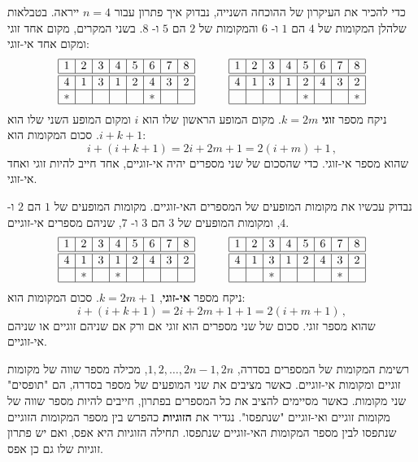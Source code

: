 כדי להכיר את העיקרון של ההוכחה השנייה, נבדוק איך פתרון עבור
$n=4$
ייראה. בטבלאות שלהלן המקומות של 
$4$
הם 
$1$
ו-%
$6$
והמקומות של
$2$
הם
$5$
ו-%
$8$.
בשני המקרים, מקום אחד זוגי ומקום אחד אי-זוגי:
\[
\begin{array}{|c|c|c|c|c|c|c|c|}
\hline
1&2&3&4&5&6&7&8\\
\hline\hline
4&1&3&1&2&4&3&2\\\hline
*&&&&&*&&\\\hline
\end{array}
\hspace{3em}
\begin{array}{|c|c|c|c|c|c|c|c|}
\hline
1&2&3&4&5&6&7&8\\
\hline\hline
4&1&3&1&2&4&3&2\\\hline
&&&&*&&&*\\\hline
\end{array}
\]
ניקח מספר
\textbf{זוגי}
$k=2m$. 
מקום המופע הראשון שלו הוא
$i$
ומקום המופע השני שלו הוא
$i+k+1$.
סכום המקומות הוא:
\[
i+(i+k+1)=2i+2m+1=2(i+m)+1\,,
\]
שהוא מספר אי-זוגי. כדי שהסכום של שני מספרים יהיה אי-זוגיים, אחד חייב להיות זוגי ואחד אי-זוגי.

נבדוק עכשיו את מקומות המופעים של המספרים האי-זוגיים. מקומות המופעים של
$1$
הם
$2$
ו-%
$4$,
ומקומות המופעים של
$3$
הם
$3$
ו-%
$7$,
שניהם מספרים אי-זוגיים.
\[
\begin{array}{|c|c|c|c|c|c|c|c|}
\hline
1&2&3&4&5&6&7&8\\
\hline\hline
4&1&3&1&2&4&3&2\\\hline
&*&&*&&&&\\\hline
\end{array}
\hspace{3em}
\begin{array}{|c|c|c|c|c|c|c|c|}
\hline
1&2&3&4&5&6&7&8\\
\hline\hline
4&1&3&1&2&4&3&2\\\hline
&&*&&&&*&\\\hline
\end{array}
\]
ניקח מספר 
\textbf{אי-זוגי},
$k=2m+1$.
סכום המקומות הוא:
\[
i+(i+k+1)=2i+2m+1+1=2(i+m+1)\,,
\]
שהוא מספר זוגי. סכום של שני מספרים הוא זוגי אם ורק אם שניהם זוגיים או שניהם אי-זוגיים.

רשימת המקומות של המספרים בסדרה,
$1,2,\ldots,2n-1,2n$,
מכילה מספר שווה של מקומות זוגיים ומקומות אי-זוגיים. כאשר מציבים את שני המופעים של מספר בסדרה, הם "תופסים" שני מקומות. כאשר מסיימים להציב את כל המספרים בפתרון, חייבים להיות מספר שווה של מקומות זוגיים ואי-זוגיים "שנתפסו". נגדיר את 
\textbf{הזוגיות}
כהפרש בין מספר המקומות הזוגיים שנתפסו לבין מספר המקומות האי-זוגיים שנתפסו. תחילה הזוגיות היא אפס, ואם יש פתרון זוגיות שלו גם כן אפס.


